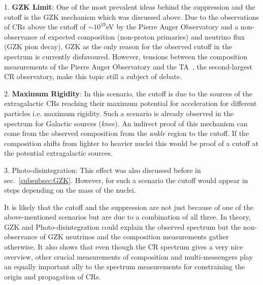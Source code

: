 1. \textbf{GZK Limit}: One of the most prevalent ideas behind the suppression and the cutoff is the GZK mechanism which was discussed above. Due to the observations of \glspl{CR} above the cutoff of $\sim 10^{19}$eV by the Pierre Auger Observatory and a non-observance of expected composition (non-proton primaries) and neutrino flux (GZK pion decay), GZK as the only reason for the observed cutoff in the spectrum is currently disfavoured. However, tensions between the composition measurements of the Pierre Auger Observatory and the \gls{TA}~\cite{kawai2008telescope}, the second-largest \gls*{CR} observatory, make this topic still a subject of debate.

2. \textbf{Maximum Rigidity}: In this scenario, the cutoff is due to the sources of the extragalactic \glspl{CR} reaching their maximum potential for acceleration for different particles i.e. maximum rigidity. Such a scenario is already observed in the spectrum for Galactic sources (\textit{knee}). An indirect proof of this mechanism can come from the observed composition from the \textit{ankle} region to the cutoff. If the composition shifts from lighter to heavier nuclei this would be proof of a cutoff at the potential extragalactic sources. 

3. Photo-disintegration: This effect was also discussed before in sec.~\ref{subsubsec:GZK}. However, for such a scenario the cutoff would appear in steps depending on the mass of the nuclei. 

It is likely that the cutoff and the suppression are not just because of one of the above-mentioned scenarios but are due to a combination of all three. In theory, \gls{GZK} and Photo-disintegration could explain the observed spectrum but the non-observance of \gls*{GZK} neutrinos and the composition measurements gather otherwise. It also shows that even though the CR spectrum gives a very nice overview, other crucial measurements of composition and multi-messengers play an equally important ally to the spectrum measurements for constraining the origin and propagation of \glspl{CR}.

